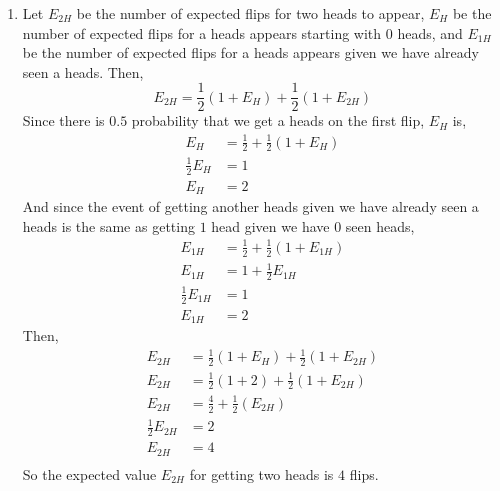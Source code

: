 \documentclass[12pt]{article}
\begin{document}
\begin{solution}
    \bbni
    \begin{enumerate}
        \item  Let $E_{2H}$ be the number of expected flips for two heads to appear, $E_H$ be the number of expected flips for a heads appears starting with $0$ heads, and $E_{1H}$ be the number of expected flips for a heads appears given we have already seen a heads. Then, 
        \[E_{2H} = \frac{1}{2}(1+E_H) + \frac{1}{2}(1+E_{2H}) \]
        Since there is $0.5$ probability that we get a heads on the first flip, $E_H$ is,  
        \begin{align*}
            E_H &= \frac{1}{2} + \frac{1}{2}(1+E_H) \\ 
            \frac{1}{2}E_H &= 1 \\ 
            E_H &= 2
        \end{align*}
        And since the event of getting another heads given we have already seen a heads is the same as getting $1$ head given we have $0$ seen heads,  
        \begin{align*}
            E_{1H} &= \frac{1}{2} + \frac{1}{2}(1+E_{1H}) \\ 
            E_{1H} &= 1 + \frac{1}{2}E_{1H} \\ 
            \frac{1}{2}E_{1H} &= 1\\
            E_{1H} &= 2 
        \end{align*}
        Then, 
        \begin{align*}
            E_{2H} &= \frac{1}{2}(1+E_H) + \frac{1}{2}(1+E_{2H}) \\ 
            E_{2H} &= \frac{1}{2}(1+2) + \frac{1}{2}(1+E_{2H}) \\ 
            E_{2H} &= \frac{4}{2} + \frac{1}{2}(E_{2H}) \\ 
            \frac{1}{2}E_{2H} &= 2 \\
            E_{2H} &= 4\\ 
        \end{align*}
        So the expected value $E_{2H}$ for getting two heads is $4$ flips. 


\end{enumerate}
\end{solution}
\end{document}
